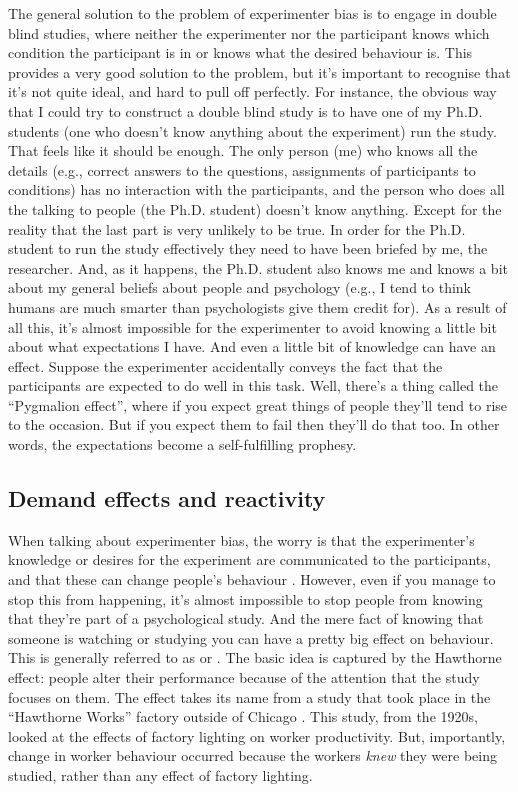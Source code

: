 The general solution to the problem of experimenter bias is to engage in double blind studies, where neither the experimenter nor the participant knows which condition the participant is in or knows what the desired behaviour is. This provides a very good solution to the problem, but it's important to recognise that it's not quite ideal, and hard to pull off perfectly. For instance, the obvious way that I could try to construct a double blind study is to have one of my Ph.D. students (one who doesn't know anything about the experiment) run the study. That feels like it should be enough. The only person (me) who knows all the details (e.g., correct answers to the questions, assignments of participants to conditions) has no interaction with the participants, and the person who does all the talking to people (the Ph.D. student) doesn't know anything. Except for the  reality that the last part is very unlikely to be true. In order for the Ph.D. student to run the study effectively they need to have been briefed by me, the researcher. And, as it happens, the Ph.D. student also knows me and knows a bit about my general beliefs about people and psychology (e.g., I tend to think humans are much smarter than psychologists give them credit for). As a result of all this, it's almost impossible for the experimenter to avoid knowing a little bit about what expectations I have. And even a little bit of knowledge can have an effect. Suppose the experimenter accidentally conveys the fact that the participants are expected to do well in this task. Well, there's a thing called the ``Pygmalion effect'', where if you expect great things of people they'll tend to rise to the occasion. But if you expect them to fail then they'll do that too. In other words, the expectations become a self-fulfilling prophesy.


\subsection{Demand effects and reactivity}

When talking about experimenter bias, the worry is that the experimenter's knowledge or desires for the experiment are communicated to the participants, and that these can change people's behaviour \parencite{Rosenthal1966}. However, even if you manage to stop this from happening, it's almost impossible to stop people from knowing that they're part of a psychological study. And the mere fact of knowing that someone is watching or studying you can have a pretty big effect on behaviour. This is generally referred to as  or . The basic idea is captured by the Hawthorne effect: people alter their performance because of the attention that the study focuses on them. The effect takes its name from a study that took place in the ``Hawthorne Works'' factory outside of Chicago \parencite[see][]{Adair1984}. This study, from the 1920s, looked at the effects of factory lighting on worker productivity. But, importantly, change in worker behaviour occurred because the workers {\it knew} they were being studied, rather than any effect of factory lighting.

